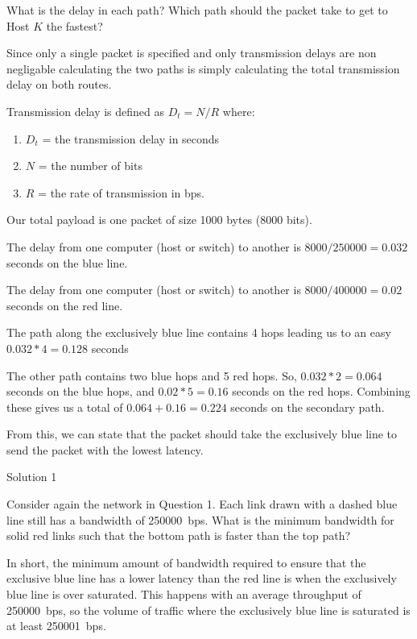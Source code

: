 \documentclass[12pt,addpoints,answers]{exam}
\begin{document}
\begin{questions}
What is the delay in each path? Which path should the packet take to get to Host $K$ the fastest?

\begin{solution}
		Since only a single packet is specified and only transmission delays are non negligable calculating the two paths is simply calculating the total transmission delay on both routes.

	Transmission delay is defined as $D_t = N / R$ where:
	\begin{enumerate}
		\item $D_t$ = the transmission delay in seconds
		\item $N$ = the number of bits
		\item $R$ = the rate of transmission in bps.
	\end{enumerate}

	Our total payload is one packet of size 1000 bytes (8000 bits).

	The delay from one computer (host or switch) to another is $8000 / 250000 = 0.032$ seconds on the blue line.

	The delay from one computer (host or switch) to another is $8000 / 400000 = 0.02$ seconds on the red line.

	The path along the exclusively blue line contains 4 hops leading us to an easy $0.032 * 4 = 0.128$ seconds

	The other path contains two blue hops and 5 red hops.  So, $0.032 * 2 = 0.064$ seconds on the blue hops, and $0.02 * 5 = 0.16$ seconds on the red hops.  Combining these gives us a total of $0.064 + 0.16 = 0.224$ seconds on the secondary path.

	From this, we can state that the packet should take the exclusively blue line to send the packet with the lowest latency.
\end{solution}
\begin{center}
	Solution 1
\end{center}
\begin{flushleft}

\end{flushleft}

\question[8] Consider again the network in Question 1. Each link drawn with a dashed blue line still has a bandwidth of \SI{250000}{bps}. What is the minimum bandwidth for solid red links such that the bottom path is faster than the top path?

\begin{solution}
	In short, the minimum amount of bandwidth required to ensure that the exclusive blue line has a lower latency than the red line is when the exclusively blue line is over saturated.  This happens with an average throughput of \SI{250000}{bps}, so the volume of traffic where the exclusively blue line is saturated is at least \SI{250001}{bps}.
\end{solution}


\end{questions}
\end{document}
